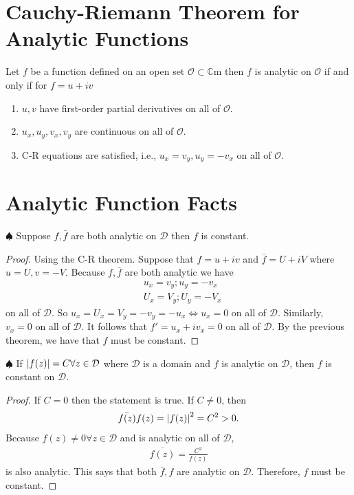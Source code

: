 \documentclass{article}
\theoremstyle{definition}
\newcommand{\f}[2]{\frac{#1}{#2}}
\newcommand{\C}{\mathbb{C}}
\newcommand{\nn}{\nonumber}
\begin{document}
\section{Cauchy-Riemann Theorem for Analytic Functions}

Let $f$ be a function defined on an open set $\mathcal{O} \subset \C$m then $f$ is analytic on $\mathcal{O}$ if and only if for $f = u + iv$
\begin{enumerate}
	\item $u,v$ have first-order partial derivatives on all of $\mathcal{O}$. 
	
	\item $u_x,u_y,v_x,v_y$ are continuous on all of $\mathcal{O}$. 
	
	\item C-R equations are satisfied, i.e., $u_x = v_y, u_y = -v_x$ on all of $\mathcal{O}$. 
\end{enumerate}


\section{Analytic Function Facts}

\noindent $\spadesuit$ Suppose $f, \bar{f}$ are both analytic on $\mathcal{D}$ then $f$ is constant. 

\begin{proof}
	Using the C-R theorem. Suppose that $f = u+ iv$ and $\bar{f} = U + iV$ where $u = U, v = -V$. Because $f,\bar{f}$ are both analytic we have
	\begin{align}
	&u_x = v_y; u_y = -v_x\nn\\
	&U_x = V_y; U_y = -V_x
	\end{align}  
	on all of $\mathcal{D}$. So $u_x = U_x = V_y = -v_y = -u_x \iff u_x = 0$ on all of $\mathcal{D}$. Similarly, $v_x = 0$ on all of $\mathcal{D}$. It follows that $f' = u_x + iv_x = 0$ on all of $\mathcal{D}$. By the previous theorem, we have that $f$ must be constant. 
\end{proof}



\noindent $\spadesuit$  If $\abs{f(z)} = C \forall z\in \mathcal{D}$ where $\mathcal{D}$ is a domain and $f$ is analytic on $\mathcal{D}$, then $f$ is constant on $\mathcal{D}$. 





\begin{proof}
	If $C = 0$ then the statement is true. If $C \neq 0$, then 
	\begin{align}
	\bar{f(z)}f(z) = \abs{f(z)}^2 = C^2 > 0.
	\end{align}
	Because $f(z) \neq 0 \forall z \in \mathcal{D}$ and is analytic on all of $\mathcal{D}$, 
	\begin{align}
	\bar{f(z)} = \f{C^2}{f(z)}
	\end{align}
	is also analytic. This says that both $\bar{f},f$ are analytic on $\mathcal{D}$. Therefore, $f$ must be constant. 
\end{proof}
\end{document}
